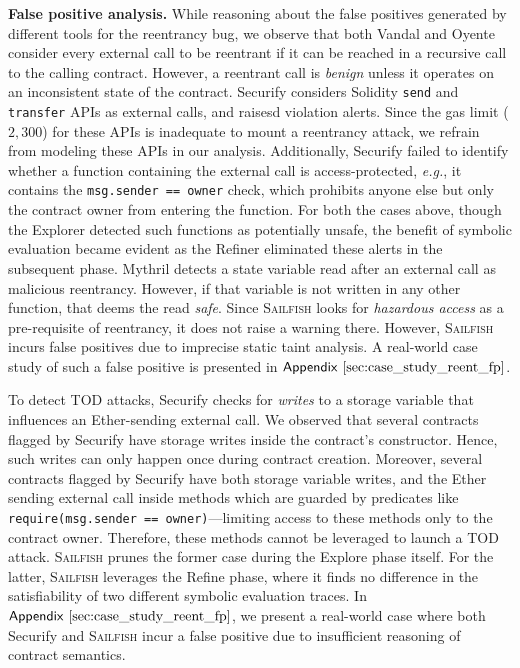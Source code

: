 \documentclass[conference, romanappendices]{tex/IEEEtran}
\theoremstyle{bfnote}
\newcommand{\toolname}{\textsc{Sailfish}\xspace}
\newcommand{\oyente}{{\sc Oyente}\xspace}
\newcommand{\explore}{{\sc Explore}\xspace}
\newcommand{\explorer}{{\sc Explorer}\xspace}
\newcommand{\refine}{{\sc Refine}\xspace}
\newcommand{\refiner}{{\sc Refiner}\xspace}
\newcommand{\securify}{{\sc Securify}\xspace}
\newcommand{\vandal}{{\sc Vandal}\xspace}
\newcommand{\solidity}{{\sc Solidity}\xspace}
\newcommand{\ether}{{Ether}\xspace}
\newcommand{\reentrancy}{{reentrancy}\xspace}
\newcommand{\mythril}{{\sc Mythril}\xspace}
\newcommand{\eg}{\textit{e.g.}}
\newcommand{\Appen}[1]{\ensuremath{\sf Appendix~\ref{#1}}}
\begin{document}
\noindent
\textbf{False positive analysis.}
While reasoning about the false positives generated by different tools for the \reentrancy bug, we observe that both \vandal{} and \oyente consider every external call to be reentrant if it can be reached in a recursive call to the calling contract.
However, a reentrant call is \textit{benign} unless it operates on an inconsistent state of the contract.
\securify{} considers \solidity{} \texttt{send} and \texttt{transfer} APIs as external calls, and raisesd violation alerts.
Since the gas limit ($2,300$) for these APIs is {inadequate\EndAccSupp{}} to mount a \reentrancy attack, we {refrain\EndAccSupp{}} from modeling these APIs in our analysis.
Additionally, \securify{} failed to identify whether a function containing the external call is access-protected, \eg, it contains the \texttt{msg.sender == owner} check, which prohibits anyone else but only the contract owner from entering the function.
For both the cases above, though the \explorer detected such functions as potentially unsafe, the benefit of symbolic evaluation became evident as the \refiner{} eliminated these alerts in the subsequent phase.
\mythril{} detects a state variable read after an external call as malicious \reentrancy.
However, if that variable is not written in any other function, that deems the read \textit{safe}.
Since \toolname{} looks for \textit{hazardous access} as a pre-requisite of \reentrancy, it does not raise a warning there.
However, \toolname{} incurs false positives due to imprecise static taint analysis.
A real-world case study of such a false positive is presented in \Appen{sec:case_study_reent_fp}.

To detect {TOD\EndAccSupp{}} attacks, \securify checks for \emph{writes} to a storage variable that influences an \ether-sending external call.
We observed that several contracts flagged by \securify have storage writes inside the contract's constructor.
Hence, such writes can only happen once during contract creation.
Moreover, several contracts flagged by \securify have both storage variable writes, and the \ether sending external call inside methods which are guarded by predicates like \texttt{require(msg.sender == owner)}---limiting access to these methods only to the contract owner.
Therefore, these methods cannot be leveraged to launch a {TOD\EndAccSupp{}} attack.
\toolname prunes the former case during the \explore phase itself.
For the latter, \toolname leverages the \refine phase, where it finds no difference in the satisfiability of two different symbolic evaluation traces.
In \Appen{sec:case_study_reent_fp}, we present a real-world case  where both \securify and \toolname incur a false positive due to insufficient reasoning of contract semantics.
\end{document}
